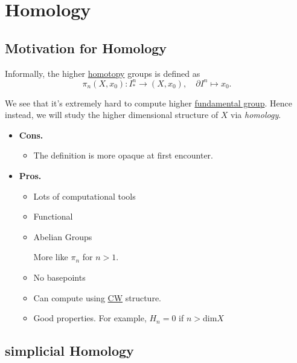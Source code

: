 \section{Homology}
\subsection{Motivation for Homology}
Informally, the higher \hyperref[def:homotopy]{homotopy} groups is defined as
\[
	\pi _{n} (X, x_0)\colon I^n_\ast \to (X, x_0),\quad \partial I^n \mapsto x_0.
\]

\begin{figure}[H]
	\centering
	\label{fig:higher-homotopy-group-dim2}
\end{figure}


We see that it's extremely hard to compute higher \hyperref[def:fundamental-group]{fundamental group}. Hence instead,
we will study the higher dimensional structure of \(X\) via \emph{homology}.

\begin{itemize}
	\item \textbf{Cons.}
	      \begin{itemize}
		      \item The definition is more opaque at first encounter.
	      \end{itemize}
	\item \textbf{Pros.}
	      \begin{itemize}
		      \item Lots of computational tools
		      \item Functional
		      \item Abelian Groups
		            \begin{remark}
			            More like \(\pi _n\) for \(n>1\).
		            \end{remark}
		      \item No basepoints
		      \item Can compute using \hyperref[def:CW-subcomplex]{CW} structure.
		      \item Good properties. For example, \(H_{n} = 0\) if \(n > \mathrm{dim} X\)
	      \end{itemize}
\end{itemize}

\subsection{simplicial Homology}
